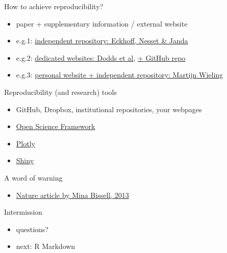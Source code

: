 \documentclass[ignorenonframetext,]{beamer}
\begin{document}
\begin{frame}{How to achieve reproducibility?}

\begin{itemize}[<+->]
\itemsep1pt\parskip0pt
\item
  paper + supplementary information / external website
\item
  e.g.1:
  \href{http://opendata.uit.no/dvn/faces/study/StudyPage.xhtml?studyId=19}{independent
  repository: Eckhoff, Nesset \& Janda}
\item
  e.g.2:
  \href{http://www.pnas.org/content/early/2015/02/04/1411678112}{dedicated
  websites: Dodds et al},
  \href{https://github.com/andyreagan/labMT-simple}{+ GitHub repo}
\item
  e.g.3: \href{http://www.martijnwieling.nl/publications}{personal
  website + independent repository: Martijn Wieling}
\end{itemize}

\end{frame}

\begin{frame}{Reproducibility (and research) tools}

\begin{itemize}[<+->]
\itemsep1pt\parskip0pt
\item
  GitHub, Dropbox, institutional repositories, your webpages
\item
  \href{https://osf.io/}{Open Science Framework}
\item
  \href{https://plot.ly/~cainesap/28/lat-vs-lon/}{Plotly}
\item
  \href{https://cainesap.shinyapps.io/shinyGlottolog/}{Shiny}
\end{itemize}

\end{frame}

\begin{frame}{A word of warning}

\begin{itemize}[<+->]
\itemsep1pt\parskip0pt
\item
  \href{http://www.nature.com/news/reproducibility-the-risks-of-the-replication-drive-1.14184}{Nature
  article by Mina Bissell, 2013}
\end{itemize}

\end{frame}

\begin{frame}{Intermission}

\begin{itemize}[<+->]
\itemsep1pt\parskip0pt
\item
  questions?
\item
  next: R Markdown
\end{itemize}

\end{frame}
\end{document}
